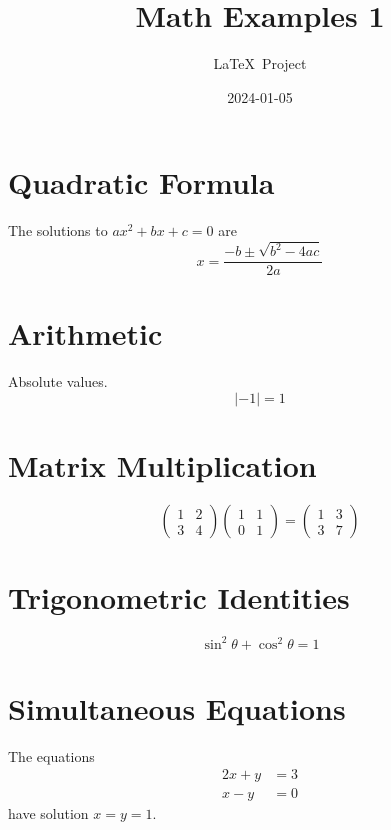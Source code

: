 \documentclass{article}
\title{Math Examples 1}
\author{\LaTeX\ Project}
\date{2024-01-05}
\begin{document}

\section{Quadratic Formula}
The solutions to $ax^2+bx+c=0$ are
\[
x=\frac{-b \pm \sqrt{b^2-4ac}}{2a}
\]

\section{Arithmetic}
Absolute values.
\[ \lvert -1\rvert = 1 \]


\section{Matrix Multiplication}
\[
  \begin{pmatrix}
    1&2\\3&4
  \end{pmatrix}
  \begin{pmatrix}
    1&1\\0&1
  \end{pmatrix}
   =
  \begin{pmatrix}
    1&3\\3&7
  \end{pmatrix}
\]

\section{Trigonometric Identities}
\[\sin^2\theta+\cos^2\theta=1\]

\section{Simultaneous Equations}
The equations
\begin{align*}
  2x+y&=3\\
  x-y&=0
\end{align*}
have solution $x=y=1$.
\end{document}
